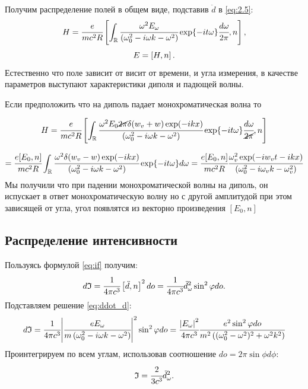 Получим распределение полей в общем виде, подставив $\ddot d$ в \ref{eq:2.5}:
\begin{equation}
    H = \cfrac{e}{mc^2R}\left[ \int_{\mathbb{R}}
    \cfrac{\omega^2E_\omega}{\left( \omega_0^2 - i\omega k - \omega^2  \right)}\exp{-it\omega}\cfrac{d\omega}{2\pi}, n \right],
    \label{eq:fild}
\end{equation}
\begin{equation}
    E = \left[ H, n \right].
\end{equation}
Естественно что поле зависит от висит от времени, и угла измерения, 
в качестве параметров выступают характеристики диполя и падющей волны. 

Если предположить что на диполь падает монохроматическая волна то 

\begin{equation}
    H = \cfrac{e}{mc^2R}\left[ \int_{\mathbb{R}}
    \cfrac{\omega^2 E_0 \cancel{2 \pi} \delta (w_v+w) \exp (-ikx)}{\left( \omega_0^2 - i\omega k - \omega^2  \right)}\exp{-it\omega}
    \cfrac{d\omega}{\cancel{2 \pi}}, n \right]
\end{equation}

\begin{equation}
    = \cfrac{e[E_0, n]}{mc^2R}\int_{\mathbb{R}}
    \cfrac{\omega^2 \delta (w_v-w) \exp (-ikx)}{\left( \omega_0^2 - i\omega k - \omega^2  \right)}\exp{-it\omega}
    d\omega = 
    \cfrac{e[E_0, n]}{mc^2R}
    \cfrac{\omega_v^2 \exp (-iw_v t-ikx)}{\left( \omega_0^2 - i\omega_v k - \omega_v^2  \right)}
\end{equation}
Мы получили что при падении монохроматической волны на диполь, он испускает 
в ответ монохроматическую волну но с другой амплитудой при этом зависящей от 
угла, угол появлятся из векторно произведения $[E_0, n]$


\subsection{Распределение интенсивности}

Пользуясь формулой \ref{eq:if} получим:
\begin{equation}
    d\mathfrak{I} = \cfrac{1}{4\pi c^3}\left[ \ddot{d}, n \right]^2do
    = \cfrac{1}{4\pi c^3}\ddot d^2_\omega \sin^2\varphi do.
\end{equation}
Подставляем решение \ref{eq:ddot_d}:
\begin{equation}
    d\mathfrak{I} = \cfrac{1}{4\pi c^3} \abs{\cfrac{eE_\omega}{m\left( \omega_0^2 
    - i\omega k - \omega^2  \right)}}^2 \sin^2\varphi do = \cfrac{\abs{E_\omega}^2}{4\pi c^3} \cfrac{e^2\sin^2\varphi do}{m^2\left( (\omega_0^2- \omega^2)^2 
    + \omega^2 k^2   \right)} 
\end{equation}
Проинтегрируем по всем углам, использовав соотношение $do = 2 \pi \sin{\phi} d\phi$:
\begin{equation}
    \mathfrak{I} = \cfrac{2}{3c^3} \ddot{d}^2_\omega.
\end{equation}

